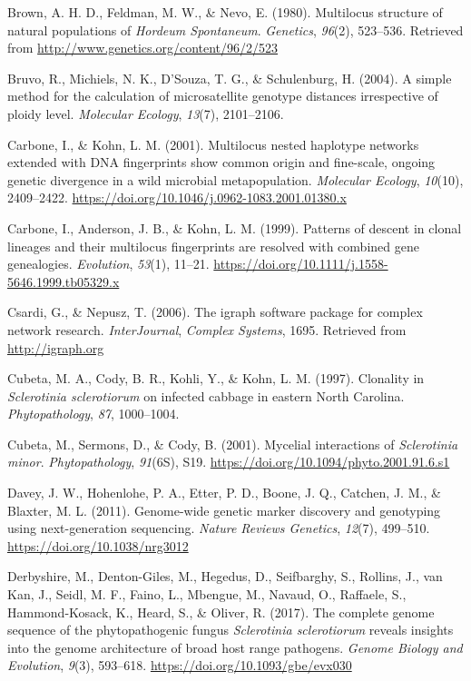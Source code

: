 \documentclass[fleqn,10pt,lineno]{wlpeerj} %
\theoremstyle{definition}
\theoremstyle{definition}
\theoremstyle{definition}
\theoremstyle{remark}
\begin{document}
\hypertarget{ref-brown1980multilocus}{}
Brown, A. H. D., Feldman, M. W., \& Nevo, E. (1980). Multilocus
structure of natural populations of \emph{Hordeum Spontaneum}.
\emph{Genetics}, \emph{96}(2), 523--536. Retrieved from
\url{http://www.genetics.org/content/96/2/523}

\hypertarget{ref-bruvo2004simple}{}
Bruvo, R., Michiels, N. K., D'Souza, T. G., \& Schulenburg, H. (2004). A
simple method for the calculation of microsatellite genotype distances
irrespective of ploidy level. \emph{Molecular Ecology}, \emph{13}(7),
2101--2106.

\hypertarget{ref-carbone2001multilocus}{}
Carbone, I., \& Kohn, L. M. (2001). Multilocus nested haplotype networks
extended with DNA fingerprints show common origin and fine-scale,
ongoing genetic divergence in a wild microbial metapopulation.
\emph{Molecular Ecology}, \emph{10}(10), 2409--2422.
\url{https://doi.org/10.1046/j.0962-1083.2001.01380.x}

\hypertarget{ref-carbone1999patterns}{}
Carbone, I., Anderson, J. B., \& Kohn, L. M. (1999). Patterns of descent
in clonal lineages and their multilocus fingerprints are resolved with
combined gene genealogies. \emph{Evolution}, \emph{53}(1), 11--21.
\url{https://doi.org/10.1111/j.1558-5646.1999.tb05329.x}

\hypertarget{ref-csardi2006igraph}{}
Csardi, G., \& Nepusz, T. (2006). The igraph software package for
complex network research. \emph{InterJournal}, \emph{Complex Systems},
1695. Retrieved from \url{http://igraph.org}

\hypertarget{ref-cubeta1997clonality}{}
Cubeta, M. A., Cody, B. R., Kohli, Y., \& Kohn, L. M. (1997). Clonality
in \emph{Sclerotinia sclerotiorum} on infected cabbage in eastern North
Carolina. \emph{Phytopathology}, \emph{87}, 1000--1004.

\hypertarget{ref-cubeta2001mycelial}{}
Cubeta, M., Sermons, D., \& Cody, B. (2001). Mycelial interactions of
\emph{Sclerotinia minor}. \emph{Phytopathology}, \emph{91}(6S), S19.
\url{https://doi.org/10.1094/phyto.2001.91.6.s1}

\hypertarget{ref-davey2011genome}{}
Davey, J. W., Hohenlohe, P. A., Etter, P. D., Boone, J. Q., Catchen, J.
M., \& Blaxter, M. L. (2011). Genome-wide genetic marker discovery and
genotyping using next-generation sequencing. \emph{Nature Reviews
Genetics}, \emph{12}(7), 499--510. \url{https://doi.org/10.1038/nrg3012}

\hypertarget{ref-derbyshire2017complete}{}
Derbyshire, M., Denton-Giles, M., Hegedus, D., Seifbarghy, S., Rollins,
J., van Kan, J., Seidl, M. F., Faino, L., Mbengue, M., Navaud, O.,
Raffaele, S., Hammond-Kosack, K., Heard, S., \& Oliver, R. (2017). The
complete genome sequence of the phytopathogenic fungus \emph{Sclerotinia
sclerotiorum} reveals insights into the genome architecture of broad
host range pathogens. \emph{Genome Biology and Evolution}, \emph{9}(3),
593--618. \url{https://doi.org/10.1093/gbe/evx030}
\end{document}
